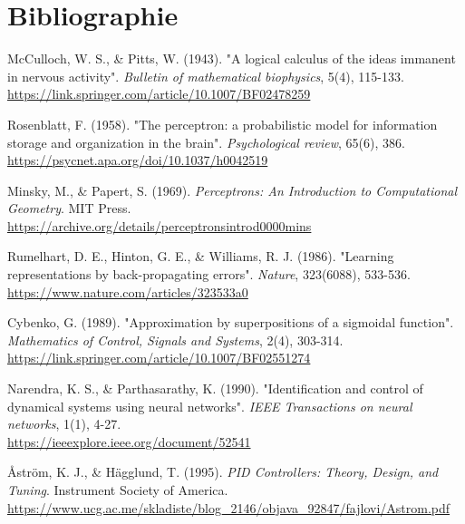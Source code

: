 \chapter*{Bibliographie}

\begin{enumerate}[label={[\arabic*]}]
	
   \item McCulloch, W. S., \& Pitts, W. (1943). "A logical calculus of the ideas immanent in nervous activity". \textit{Bulletin of mathematical biophysics}, 5(4), 115-133. \\
   \url{https://link.springer.com/article/10.1007/BF02478259}

   \item Rosenblatt, F. (1958). "The perceptron: a probabilistic model for information storage and organization in the brain". \textit{Psychological review}, 65(6), 386. \\
    \url{https://psycnet.apa.org/doi/10.1037/h0042519}

    \item Minsky, M., \& Papert, S. (1969). \textit{Perceptrons: An Introduction to Computational Geometry}. MIT Press. \\
    \url{https://archive.org/details/perceptronsintrod0000mins}

    \item Rumelhart, D. E., Hinton, G. E., \& Williams, R. J. (1986). "Learning representations by back-propagating errors". \textit{Nature}, 323(6088), 533-536. \\
    \url{https://www.nature.com/articles/323533a0}

    \item Cybenko, G. (1989). "Approximation by superpositions of a sigmoidal function". \textit{Mathematics of Control, Signals and Systems}, 2(4), 303-314. \\
    \url{https://link.springer.com/article/10.1007/BF02551274}

    \item Narendra, K. S., \& Parthasarathy, K. (1990). "Identification and control of dynamical systems using neural networks". \textit{IEEE Transactions on neural networks}, 1(1), 4-27. \\
    \url{https://ieeexplore.ieee.org/document/52541}
	
	\item Åström, K. J., \& Hägglund, T. (1995). \textit{PID Controllers: Theory, Design, and Tuning}. Instrument Society of America. \url{https://www.ucg.ac.me/skladiste/blog_2146/objava_92847/fajlovi/Astrom.pdf}
	

\end{enumerate}
